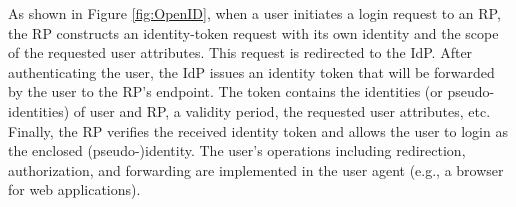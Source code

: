 As shown in Figure \ref{fig:OpenID}, when a user initiates a login request to an RP, the RP constructs an identity-token request with its own identity and the scope of the requested user attributes.
This request is redirected to the IdP.
After authenticating the user, the IdP issues an identity token that will be forwarded by the user to the RP's endpoint.
The token contains the identities (or pseudo-identities) of user and RP,
        a validity period, the requested user attributes, etc.
Finally, the RP verifies the received identity token and allows the user to login as the  enclosed (pseudo-)identity.
The user's operations including redirection, authorization, and forwarding are implemented in the user agent (e.g., a browser for web applications).




